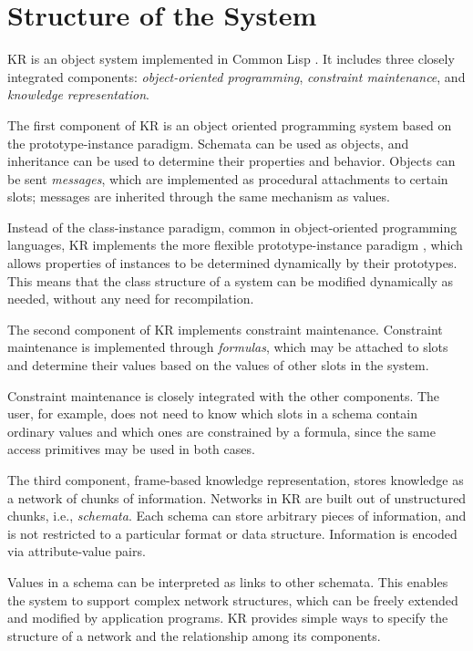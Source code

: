 \chapter{Structure of the System}
\value{top}

KR is an object system implemented in Common Lisp \cite{CommonLisp}.  It
includes three closely integrated components: {\it object-oriented
programming}, {\it constraint maintenance}, and {\it knowledge representation}.

The first component of KR is an object oriented programming system based on
the prototype-instance paradigm.  Schemata can be used as objects, and
inheritance can be used to determine their properties and behavior.
Objects can be sent {\it messages}, which are implemented as procedural
attachments to certain slots; messages are inherited through the same
mechanism as values.

Instead of the class-instance paradigm, common in object-oriented
programming languages, KR implements the more flexible prototype-instance
paradigm \cite{liebermanprototypes}, which allows properties of instances
to be determined dynamically by their prototypes.  This means that the
class structure of a system can be modified dynamically as needed, without
any need for recompilation.

The second component of KR implements constraint maintenance.  Constraint
maintenance is implemented through {\it formulas}, which may be attached to
slots and determine their values based on the values of other slots in the
system.

Constraint maintenance is closely integrated with the other components.
The user, for example, does not need to know which slots in a schema
contain ordinary values and which ones are constrained by a formula, since
the same access primitives may be used in both cases.

The third component, frame-based knowledge representation, stores knowledge
as a network of chunks of information.  Networks in KR are built out of
unstructured chunks, i.e., {\it schemata}.  Each schema can store
arbitrary pieces of information, and is not restricted to a particular
format or data structure.  Information is encoded via attribute-value
pairs.

Values in a schema can be interpreted as links to other schemata.  This
enables the system to support complex network structures, which can be
freely extended and modified by application programs.  KR provides simple
ways to specify the structure of a network and the relationship among its
components.



